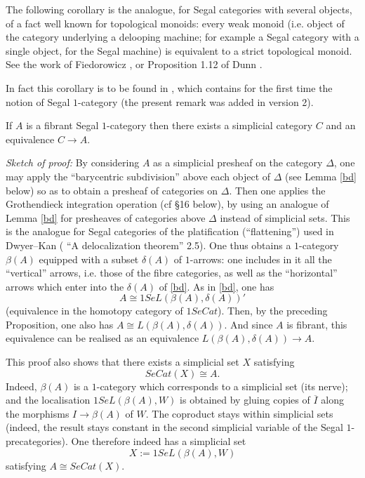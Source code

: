 The following corollary is the analogue, for Segal categories with
several objects, of a fact well known for topological monoids: every weak
monoid (i.e. object of the category underlying
a delooping machine; for example a Segal category with a single
object, for the Segal machine) is equivalent to a strict topological
monoid. See the work of
Fiedorowicz \cite{Fiedorowicz}, or Proposition 1.12 of Dunn
\cite{Dunn}.

In fact this corollary is to be found
in \cite{DKS}, which contains for the first time
the notion of Segal $1$-category (the present remark
was added in version 2).


\begin{corollary}
\label{catsimpl}
If $A$ is a fibrant Segal $1$-category then there exists a simplicial
category $C$ and an equivalence $C\rightarrow A$.
\end{corollary}
{\em Sketch of proof:}
By considering $A$ as a simplicial presheaf on the category
$\Delta$, one may apply the ``barycentric subdivision''
above each object of $\Delta$ (see Lemma \ref{bd} below) so as
to obtain a presheaf of categories on $\Delta$. Then one
applies the Grothendieck integration operation (cf \S 16 below), by
using an analogue of Lemma \ref{bd} for presheaves of categories
above $\Delta$ instead of simplicial sets. This is the analogue
for Segal categories of
the platification (``flattening'') used in
Dwyer--Kan (\cite{DwyerKanDiags} ``A delocalization theorem'' 2.5). One thus
obtains a $1$-category $\beta (A)$ equipped with a subset $\delta (A)$ of
$1$-arrows: one includes in it all the ``vertical'' arrows, i.e. those
of the fibre categories, as well as the ``horizontal'' arrows which
enter into the $\delta (A)$ of \ref{bd}. As in \ref{bd},
one has
$$
A\cong 1SeL(\beta (A), \delta (A))'
$$
(equivalence in the homotopy category of $1SeCat$).
Then, by the preceding Proposition, one also has
$A \cong L(\beta (A), \delta (A))$. And since $A$ is fibrant,
this equivalence can be realised as an equivalence
$L(\beta (A), \delta (A))\rightarrow A$.
\eop



This proof also shows that there exists a simplicial set $X$
satisfying
$$
SeCat(X) \cong A.
$$
Indeed, $\beta (A)$ is a $1$-category which
corresponds to a simplicial set (its nerve); and the localisation
$1SeL(\beta (A), W)$ is obtained by gluing copies of
$\overline{I}$ along the morphisms $I\rightarrow \beta (A)$ of $W$.
The coproduct stays within simplicial sets (indeed, the
result stays
constant in the second simplicial variable of the Segal $1$-precategories).
One therefore indeed has a simplicial set
$$
X:= 1SeL(\beta (A), W)
$$
satisfying $A\cong SeCat(X)$.


